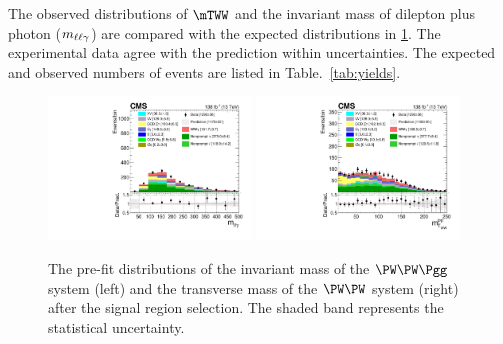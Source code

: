 The observed distributions of $\mTWW$ and the invariant mass of dilepton plus photon ($m_{\ell\ell\gamma}$) are compared with the expected distributions in \ref{fig:plots_WWgammarun2}. The experimental data agree with the prediction within uncertainties. The expected and observed numbers of events are listed in Table.~\ref{tab:yields}.

\begin{figure}[htp]
    \begin{center}      
      \includegraphics[width=0.48\textwidth]{unblind_SRCR/SR_prefit/can_mllg_emu.pdf}
      \includegraphics[width=0.48\textwidth]{unblind_SRCR/SR_prefit/can_mT_pf_emu.pdf}      
    \caption{The pre-fit distributions of the invariant mass of the $\PW\PW\Pgg$ system (left) and the transverse mass of the $\PW\PW$ system (right) after the signal region selection. The shaded band represents the statistical uncertainty.}
        \label{fig:plots_WWgammarun2}
    \end{center}
\end{figure}

